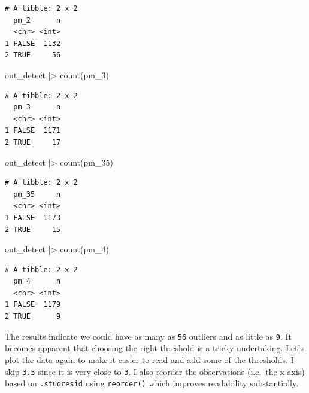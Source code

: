 \documentclass[
  letterpaper,
  DIV=11,
  numbers=noendperiod]{scrreprt}
\newenvironment{Shaded}{\begin{snugshade}}{\end{snugshade}}
\newcommand{\FunctionTok}[1]{\textcolor[rgb]{0.28,0.35,0.67}{#1}}
\newcommand{\NormalTok}[1]{\textcolor[rgb]{0.00,0.23,0.31}{#1}}
\newcommand{\SpecialCharTok}[1]{\textcolor[rgb]{0.37,0.37,0.37}{#1}}
\begin{document}
\begin{verbatim}
# A tibble: 2 x 2
  pm_2      n
  <chr> <int>
1 FALSE  1132
2 TRUE     56
\end{verbatim}

\begin{Shaded}
\begin{Highlighting}[]
\NormalTok{out\_detect }\SpecialCharTok{|\textgreater{}} \FunctionTok{count}\NormalTok{(pm\_3)}
\end{Highlighting}
\end{Shaded}

\begin{verbatim}
# A tibble: 2 x 2
  pm_3      n
  <chr> <int>
1 FALSE  1171
2 TRUE     17
\end{verbatim}

\begin{Shaded}
\begin{Highlighting}[]
\NormalTok{out\_detect }\SpecialCharTok{|\textgreater{}} \FunctionTok{count}\NormalTok{(pm\_35)}
\end{Highlighting}
\end{Shaded}

\begin{verbatim}
# A tibble: 2 x 2
  pm_35     n
  <chr> <int>
1 FALSE  1173
2 TRUE     15
\end{verbatim}

\begin{Shaded}
\begin{Highlighting}[]
\NormalTok{out\_detect }\SpecialCharTok{|\textgreater{}} \FunctionTok{count}\NormalTok{(pm\_4)}
\end{Highlighting}
\end{Shaded}

\begin{verbatim}
# A tibble: 2 x 2
  pm_4      n
  <chr> <int>
1 FALSE  1179
2 TRUE      9
\end{verbatim}

The results indicate we could have as many as \texttt{56} outliers and
as little as \texttt{9}. It becomes apparent that choosing the right
threshold is a tricky undertaking. Let's plot the data again to make it
easier to read and add some of the thresholds. I skip \texttt{3.5} since
it is very close to \texttt{3}. I also reorder the observations
(i.e.~the x-axis) based on \texttt{.studresid} using \texttt{reorder()}
which improves readability substantially.
\end{document}
